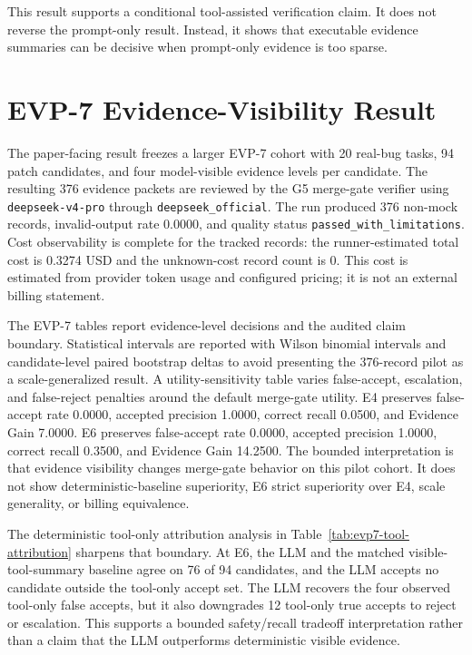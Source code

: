 \documentclass[conference]{IEEEtran}
\begin{document}
This result supports a conditional tool-assisted verification claim. It does
not reverse the prompt-only result. Instead, it shows that executable evidence
summaries can be decisive when prompt-only evidence is too sparse.

\section{EVP-7 Evidence-Visibility Result}

The paper-facing result freezes a larger EVP-7 cohort with 20 real-bug tasks,
94 patch candidates, and four model-visible evidence
levels per candidate. The resulting 376 evidence
packets are reviewed by the G5 merge-gate verifier using
\texttt{deepseek-v4-pro} through \texttt{deepseek\_official}. The run
produced 376 non-mock records, invalid-output rate
0.0000, and quality status
\texttt{passed\_with\_limitations}. Cost observability is complete for the
tracked records: the runner-estimated total cost is 0.3274
USD and the unknown-cost record count is 0. This
cost is estimated from provider token usage and configured pricing; it is not
an external billing statement.

The EVP-7 tables report evidence-level decisions and the audited claim
boundary. Statistical intervals are reported with Wilson binomial intervals
and candidate-level paired bootstrap deltas to avoid presenting the 376-record
pilot as a scale-generalized result. A utility-sensitivity table varies
false-accept, escalation, and false-reject penalties around the default
merge-gate utility. E4 preserves false-accept rate 0.0000, accepted
precision 1.0000, correct recall 0.0500, and
Evidence Gain 7.0000. E6 preserves false-accept rate
0.0000, accepted precision 1.0000, correct
recall 0.3500, and Evidence Gain 14.2500. The bounded
interpretation is that evidence visibility changes merge-gate behavior on this
pilot cohort. It does not show deterministic-baseline superiority, E6
strict superiority over E4, scale generality, or billing equivalence.

The deterministic tool-only attribution analysis in
Table~\ref{tab:evp7-tool-attribution} sharpens that boundary. At E6, the LLM
and the matched visible-tool-summary baseline agree on 76 of 94 candidates, and
the LLM accepts no candidate outside the tool-only accept set. The LLM recovers
the four observed tool-only false accepts, but it also downgrades 12 tool-only
true accepts to reject or escalation. This supports a bounded safety/recall
tradeoff interpretation rather than a claim that the LLM outperforms
deterministic visible evidence.
\end{document}
